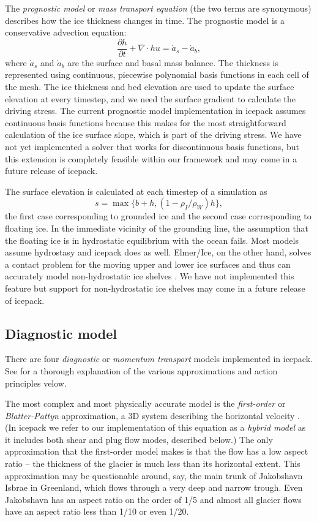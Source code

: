 \documentclass{article}
\theoremstyle{definition}
\theoremstyle{plain}
\begin{document}
The \emph{prognostic model} or \emph{mass transport equation} (the two terms are synonymous) describes how the ice thickness changes in time.
The prognostic model is a conservative advection equation:
\begin{equation}
    \frac{\partial h}{\partial t} + \nabla\cdot hu = \dot a_s - \dot a_b,
\end{equation}
where $\dot a_s$ and $\dot a_b$ are the surface and basal mass balance.
The thickness is represented using continuous, piecewise polynomial basis functions in each cell of the mesh.
The ice thickness and bed elevation are used to update the surface elevation at every timestep, and we need the surface gradient to calculate the driving stress.
The current prognostic model implementation in icepack assumes continuous basis functions because this makes for the most straightforward calculation of the ice surface slope, which is part of the driving stress.
We have not yet implemented a solver that works for discontinuous basis functions, but this extension is completely feasible within our framework and may come in a future release of icepack.

The surface elevation is calculated at each timestep of a simulation as
\begin{equation}
    s = \max\{b + h, (1 - \rho_I / \rho_W)h\},
\end{equation}
the first case corresponding to grounded ice and the second case corresponding to floating ice.
In the immediate vicinity of the grounding line, the assumption that the floating ice is in hydrostatic equilibrium with the ocean fails.
Most models assume hydrostasy and icepack does as well.
Elmer/Ice, on the other hand, solves a contact problem for the moving upper and lower ice surfaces and thus can accurately model non-hydrostatic ice shelves \citep{gagliardini2013capabilities}.
We have not implemented this feature but support for non-hydrostatic ice shelves may come in a future release of icepack.


\subsection{Diagnostic model}

There are four \emph{diagnostic} or \emph{momentum transport} models implemented in icepack.
See \citet{dukowicz2010consistent} for a thorough explanation of the various approximations and action principles velow.

The most complex and most physically accurate model is the \emph{first-order} or \emph{Blatter-Pattyn} approximation, a 3D system describing the horizontal velocity \citep{blatter1995velocity, pattyn2003new}.
(In icepack we refer to our implementation of this equation as a \emph{hybrid model} as it includes both shear and plug flow modes, described below.)
The only approximation that the first-order model makes is that the flow has a low aspect ratio -- the thickness of the glacier is much less than its horizontal extent.
This approximation may be questionable around, say, the main trunk of Jakobshavn Isbrae in Greenland, which flows through a very deep and narrow trough.
Even Jakobshavn has an aspect ratio on the order of 1/5 and almost all glacier flows have an aspect ratio less than 1/10 or even 1/20.
\end{document}
